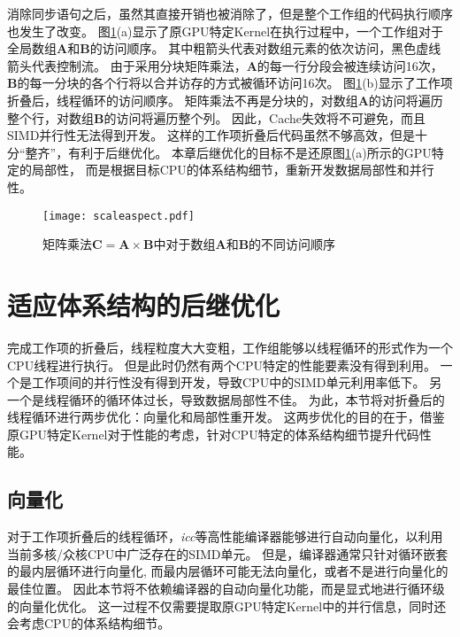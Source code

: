消除同步语句之后，虽然其直接开销也被消除了，但是整个工作组的代码执行顺序也发生了改变。
图\ref{access}(a)显示了原GPU特定Kernel在执行过程中，一个工作组对于全局数组$\bm{A}$和$\bm{B}$的访问顺序。
其中粗箭头代表对数组元素的依次访问，黑色虚线箭头代表控制流。
由于采用分块矩阵乘法，$\bm{A}$的每一行分段会被连续访问16次，
$\bm{B}$的每一分块的各个行将以合并访存的方式被循环访问16次。
图\ref{access}(b)显示了工作项折叠后，线程循环的访问顺序。
矩阵乘法不再是分块的，对数组$\bm{A}$的访问将遍历整个行，对数组$\bm{B}$的访问将遍历整个列。
因此，Cache失效将不可避免，而且SIMD并行性无法得到开发。
这样的工作项折叠后代码虽然不够高效，但是十分``整齐''，有利于后继优化。
本章后继优化的目标不是还原图\ref{access}(a)所示的GPU特定的局部性，
而是根据目标CPU的体系结构细节，重新开发数据局部性和并行性。


\begin{figure}[htb]
\centering
\texttt{[image: scaleaspect.pdf]}
\caption{矩阵乘法$\bm{C}=\bm{A}\times \bm{B}$中对于数组$\bm{A}$和$\bm{B}$的不同访问顺序}
\label{access}
\end{figure}


\section{适应体系结构的后继优化}
\label{postoptimizationsec}
完成工作项的折叠后，线程粒度大大变粗，工作组能够以线程循环的形式作为一个CPU线程进行执行。
但是此时仍然有两个CPU特定的性能要素没有得到利用。
一个是工作项间的并行性没有得到开发，导致CPU中的SIMD单元利用率低下。
另一个是线程循环的循环体过长，导致数据局部性不佳。
为此，本节将对折叠后的线程循环进行两步优化：向量化和局部性重开发。
这两步优化的目的在于，借鉴原GPU特定Kernel对于性能的考虑，针对CPU特定的体系结构细节提升代码性能。

\subsection{向量化}
对于工作项折叠后的线程循环，{\em icc}等高性能编译器能够进行自动向量化，以利用当前多核/众核CPU中广泛存在的SIMD单元。
但是，编译器通常只针对循环嵌套的最内层循环进行向量化,
而最内层循环可能无法向量化，或者不是进行向量化的最佳位置。
因此本节将不依赖编译器的自动向量化功能，而是显式地进行循环级的向量化优化。
这一过程不仅需要提取原GPU特定Kernel中的并行信息，同时还会考虑CPU的体系结构细节。


